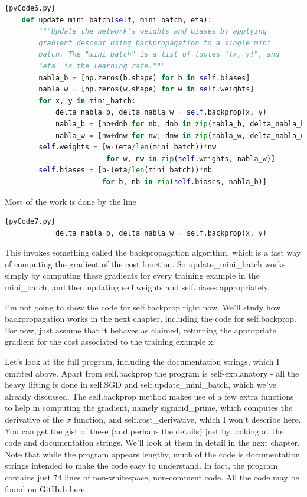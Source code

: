 \documentclass[a4paper,12pt]{report}%
\begin{document}
\begin{lstlisting}[language=Python,breaklines,basicstyle=\footnotesize\ttfamily]{pyCode6.py}
    def update_mini_batch(self, mini_batch, eta):
        """Update the network's weights and biases by applying
        gradient descent using backpropagation to a single mini
        batch. The "mini_batch" is a list of tuples "(x, y)", and
        "eta" is the learning rate."""
        nabla_b = [np.zeros(b.shape) for b in self.biases]
        nabla_w = [np.zeros(w.shape) for w in self.weights]
        for x, y in mini_batch:
            delta_nabla_b, delta_nabla_w = self.backprop(x, y)
            nabla_b = [nb+dnb for nb, dnb in zip(nabla_b, delta_nabla_b)]
            nabla_w = [nw+dnw for nw, dnw in zip(nabla_w, delta_nabla_w)]
        self.weights = [w-(eta/len(mini_batch))*nw
                        for w, nw in zip(self.weights, nabla_w)]
        self.biases = [b-(eta/len(mini_batch))*nb
                       for b, nb in zip(self.biases, nabla_b)]
\end{lstlisting}

Most of the work is done by the line

\begin{lstlisting}[language=Python,breaklines,basicstyle=\footnotesize\ttfamily]{pyCode7.py}
            delta_nabla_b, delta_nabla_w = self.backprop(x, y)
\end{lstlisting}

This invokes something called the backpropagation algorithm, which is a fast way of computing the gradient of the cost function. So update\_mini\_batch works simply by computing these gradients for every training example in the mini\_batch, and then updating self.weights and self.biases appropriately.

I'm not going to show the code for self.backprop right now. We'll study how backpropagation works in the next chapter, including the code for self.backprop. For now, just assume that it behaves as claimed, returning the appropriate gradient for the cost associated to the training example x.

Let's look at the full program, including the documentation strings, which I omitted above. Apart from self.backprop the program is self-explanatory - all the heavy lifting is done in self.SGD and self.update\_mini\_batch, which we've already discussed. The self.backprop method makes use of a few extra functions to help in computing the gradient, namely sigmoid\_prime, which computes the derivative of the $\sigma$ function, and self.cost\_derivative, which I won't describe here. You can get the gist of these (and perhaps the details) just by looking at the code and documentation strings. We'll look at them in detail in the next chapter. Note that while the program appears lengthy, much of the code is documentation strings intended to make the code easy to understand. In fact, the program contains just 74 lines of non-whitespace, non-comment code. All the code may be found on GitHub here.
\end{document}
